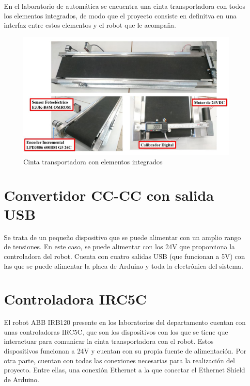 En el laboratorio de automática se encuentra una cinta transportadora con todos los elementos integrados,
de modo que el proyecto consiste en definitva en una interfaz entre estos elementos y el robot que le
acompaña.

\begin{figure}[hbtp]
    \centering
    \includegraphics[width=\textwidth]{02-hardware/10-banda.png}
    \caption{Cinta transportadora con elementos integrados}
    \label{fig:figura210}
    \end{figure}

\section{Convertidor CC-CC con salida USB}

Se trata de un pequeño dispositivo que se puede alimentar con un amplio rango de tensiones. En este caso,
se puede alimentar con los 24V que proporciona la controladora del robot. Cuenta con cuatro salidas USB 
(que funcionan a 5V) con las que se puede alimentar la placa de Arduino y toda la electrónica del sistema.

\section{Controladora IRC5C}

El robot ABB IRB120 presente en los laboratorios del departamento cuentan con unas controladoras IRC5C,
que son los dispositivos con los que se tiene que interactuar para comunicar la cinta transportadora con
el robot. Estos dispositivos funcionan a 24V y cuentan con su propia fuente de alimentación. Por otra parte,
cuentan con todas las conexiones necesarias para la realización del proyecto. Entre ellas, una conexión Ethernet
a la que conectar el Ethernet Shield de Arduino.

